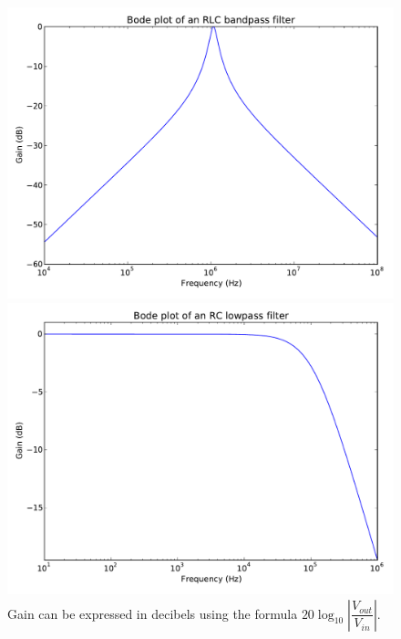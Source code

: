 \documentclass[11pt,letterpaper]{article}
\begin{document}
\begin{figure}
    \centering
    \begin{minipage}[t]{0.45\textwidth}
        \centering
        \includegraphics[width=\textwidth]{figures/bandpass.pdf}
    \end{minipage}
    \hspace{0.5cm}
    \begin{minipage}[t]{0.45\textwidth}
        \centering
        \includegraphics[width=\textwidth]{figures/lowpass.pdf}
    \end{minipage}
    \caption{Gain can be expressed in decibels using the formula
        $20\log_{10}\left|\dfrac{V_{out}}{V_{in}}\right|$.}
    \label{bandpass}
\end{figure}
\end{document}
